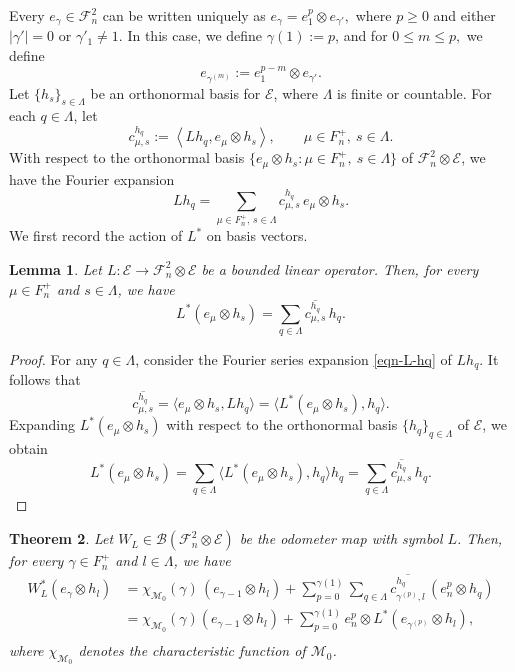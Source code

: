 \documentclass[12pt]{amsart}
\newtheorem{theorem}{Theorem}[section]
\newtheorem{lemma}[theorem]{Lemma}
\theoremstyle{definition}
\theoremstyle{remark}
\newcommand{\clb}{\mathcal{B}}
\newcommand{\cle}{\mathcal{E}}
\newcommand{\clm}{\mathcal{M}}
\newcommand{\clf}{\mathcal{F}}
\newcommand{\ol}{\overline}
\numberwithin{equation}{section}
\begin{document}
Every $e_\gamma \in \clf_n^2$ can be written uniquely as $e_\gamma
=e_1^{ p}\otimes e_{\gamma'},$ where $p \geq 0$ and either $|\gamma'|=0$ or $\gamma'_1 \neq 1$. In this case, we define $\gamma(1):=p$, and for $0 \leq m \leq p,$ we define 
\begin{equation}\label{eq:e_gamma_power_m}
  e_{\gamma^{(m)}}:=e_1^{p-m} \otimes e_{\gamma'}.  
\end{equation}
Let $\{h_s\}_{s\in \Lambda}$ be an orthonormal basis for $\cle$, 
where $\Lambda$ is finite or countable. 
For each \(q\in\Lambda\), let
\[
c^{h_q}_{\mu,s}
:=
\left\langle Lh_q, e_{\mu}\otimes h_s \right\rangle,
\qquad \mu\in F_n^+,\ s\in\Lambda.
\]
With respect to the orthonormal basis 
\(\{e_\mu\otimes h_s:\mu\in F_n^+,\ s\in\Lambda\}\) of 
\(\mathcal F_n^2\otimes\mathcal{E}\), we have the Fourier expansion
\begin{equation}\label{eqn-L-hq}
Lh_q
=
\sum_{\mu \in F_n^+,\, s \in \Lambda}
c^{h_q}_{\mu,s}\, e_{\mu}\otimes h_s.
\end{equation}
We first record the action of \(L^*\) on basis vectors.

\begin{lemma} \label{lemma:adjoint of L}
Let $L: \cle \to \clf_n^2 \otimes \cle$ be a bounded linear operator. 
Then, for every \(\mu\in F_n^+\) and \(s\in\Lambda\), we have
\begin{equation*}
L^*(e_\mu \otimes h_s) = \sum_{q \in \Lambda} \ol{c^{h_q}_{\mu,s}}\, h_q.
\end{equation*}

\end{lemma}

\begin{proof}
For any $q \in \Lambda$, consider the Fourier series expansion \eqref{eqn-L-hq} of $L h_q$.
It follows that
\[
\ol{c^{h_q}_{\mu,s}}
=
\langle e_{\mu} \otimes h_s, Lh_q \rangle
=
\langle L^*(e_{\mu} \otimes h_s), h_q \rangle.
\]
Expanding $L^*(e_{\mu} \otimes h_s)$ with respect to the orthonormal basis $\{h_q\}_{q\in\Lambda}$ of $\cle$, we obtain
\[
L^*(e_{\mu} \otimes h_s)
=
\sum_{q \in \Lambda}
\langle L^*(e_{\mu} \otimes h_s), h_q \rangle h_q
=
\sum_{q \in \Lambda}
\ol{c^{h_q}_{\mu,s}}\, h_q.
\]
\end{proof}

\begin{theorem}\label{thm:general_adjoint} 
Let $W_L \in \clb(\clf_n^2 \otimes \cle)$ be the odometer map with symbol $L$. 
Then, for every \(\gamma\in F_n^+\) and \(l\in\Lambda\), we have
\begin{equation} \label{eq:general_adjoint}
\begin{split}
W_L^*(e_\gamma \otimes h_l)
&=
\chi_{\clm_0}(\gamma )\,(e_{\gamma-1} \otimes h_l)
+
\sum_{p=0}^{\gamma(1)} 
\sum_{q \in \Lambda}
\ol{c^{h_q}_{\gamma^{(p)},l}}
\, (e_n^p \otimes h_q) \\
&= \chi_{\clm_0}(\gamma )(e_{\gamma-1} \otimes h_l) +\sum^{\gamma(1)}_{p=0} e_{n}^p \otimes L^*(e_{\gamma^{(p)}}\otimes h_l),\\
    \end{split}
\end{equation}
where $\chi_{\clm_0}$ denotes the characteristic function of $\clm_0$.
\end{theorem}
\end{document}
